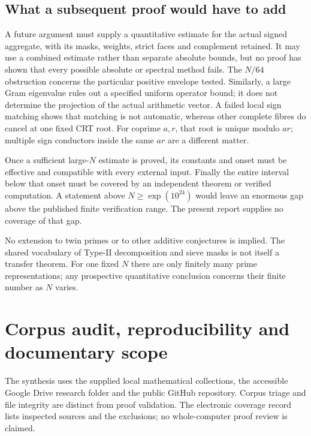 \documentclass[11pt,a4paper]{article}
\theoremstyle{definition}
\theoremstyle{remark}
\begin{document}
\subsection{What a subsequent proof would have to add}
A future argument must supply a quantitative estimate for the actual signed aggregate, with its masks, weights, strict faces and complement retained. It may use a combined estimate rather than separate absolute bounds, but no proof has shown that every possible absolute or spectral method fails. The $N/64$ obstruction concerns the particular positive envelope tested. Similarly, a large Gram eigenvalue rules out a specified uniform operator bound; it does not determine the projection of the actual arithmetic vector. A failed local sign matching shows that matching is not automatic, whereas other complete fibres do cancel at one fixed CRT root. For coprime $a,r$, that root is unique modulo $ar$; multiple sign conductors inside the same $ar$ are a different matter.

Once a sufficient large-$N$ estimate is proved, its constants and onset must be effective and compatible with every external input. Finally the entire interval below that onset must be covered by an independent theorem or verified computation. A statement above $N\ge\exp(10^{24})$ would leave an enormous gap above the published finite verification range. The present report supplies no coverage of that gap.

No extension to twin primes or to other additive conjectures is implied. The shared vocabulary of Type-II decomposition and sieve masks is not itself a transfer theorem. For one fixed $N$ there are only finitely many prime representations; any prospective quantitative conclusion concerns their finite number as $N$ varies.

\section{Corpus audit, reproducibility and documentary scope}\label{sec:corpus}
The synthesis uses the supplied local mathematical collections, the accessible Google Drive research folder and the public GitHub repository. Corpus triage and file integrity are distinct from proof validation. The electronic coverage record lists inspected sources and the exclusions; no whole-computer proof review is claimed.
\end{document}
